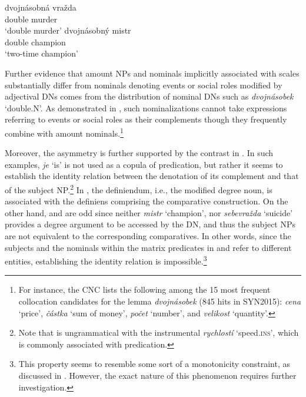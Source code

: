 \documentclass[output=paper,
modfonts,
hidelinks,
newtxmath
]{langscibook}
\begin{document}
\ea \label{dvojnasobny} \ea \gll\label{dvojnasobna-vrazda}dvojnásobná vražda\\
double murder\\
\glt `double murder'
\ex \gll dvojnásobný mistr\label{dvojnasobny-mistr}\\
double champion\\
\glt `two-time champion'
\z \z

\noindent Further evidence that amount NPs and nominals implicitly associated with scales substantially differ from nominals denoting events or social roles modified by adjectival DNs comes from the distribution of nominal DNs such as \textit{dvojnásobek} `double.N'. As demonstrated in , such nominalizations cannot take expressions referring to events or social roles as their complements though they frequently combine with amount nominals.\footnote{For instance, the CNC lists the following among the 15 most frequent collocation candidates for the lemma \textit{dvojnásobek} (845 hits in SYN2015): \textit{cena} `price', \textit{částka} `sum of money', \textit{počet} `number', and \textit{velikost} `quantity'.}

\ea\label{dvojnásobek} 
\z \z

\noindent Moreover, the asymmetry is further supported by the contrast in . In such examples, \textit{je} `is' is not used as a copula of predication, but rather it seems to establish the identity relation between the denotation of its complement and that of the subject NP.\footnote{Note that  is ungrammatical with the instrumental \textit{rychlostí} `speed.\textsc{ins}', which is commonly associated with predication.} In , the definiendum, i.e., the modified degree noun, is associated with the definiens comprising the comparative construction. On the other hand,  and  are odd since neither \textit{mistr} `champion', nor \textit{sebevražda} `suicide' provides a degree argument to be accessed by the DN, and thus the subject NPs are not equivalent to the corresponding comparatives. In other words, since the subjects and the nominals within the matrix predicates in  and  refer to different entities, establishing the identity relation is impossible.\footnote{This property seems to resemble some sort of a monotonicity constraint, as discussed in \cite{schwarzschild2002grammar}. However, the exact nature of this phenomenon requires further investigation.}
\end{document}
